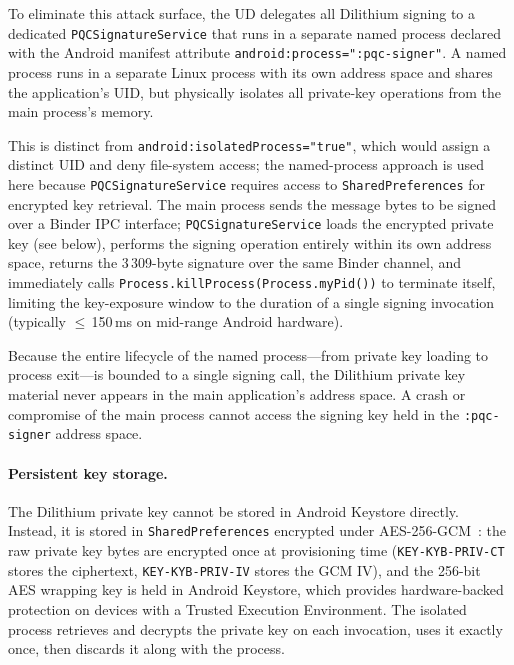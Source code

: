 \documentclass[runningheads]{llncs}
\begin{document}
To eliminate this attack surface, the UD delegates all Dilithium signing to a
dedicated \texttt{PQCSignatureService} that runs in a separate named process
declared with the Android manifest attribute \texttt{android:\allowbreak process=":\allowbreak pqc-signer"}.
A named process runs in a separate Linux process with its own address space
and shares the application's UID, but physically isolates all private-key
operations from the main process's memory.
{\sloppy
This is distinct from \texttt{android:\allowbreak isolated\allowbreak Process="true"}, which would
assign a distinct UID and deny file-system access; the named-\allowbreak process approach
is used here because \texttt{PQCSignature\allowbreak Service} requires access to
\texttt{Shared\allowbreak Preferences} for encrypted key retrieval.
The main process sends the message bytes to be signed over a Binder IPC
interface; \texttt{PQCSignature\allowbreak Service} loads the encrypted private key (see
below), performs the signing operation entirely within its own address space,
returns the 3\,309-byte signature over the same Binder channel, and
immediately calls \texttt{Process.\allowbreak kill\allowbreak Process(Process.\allowbreak my\allowbreak Pid())} to terminate
itself, limiting the key-exposure window to the duration of a single signing invocation (typically $\le$\,150\,ms on mid-range Android hardware).
\par}
Because the entire lifecycle of the named process---from private key
loading to process exit---is bounded to a single signing call, the Dilithium
private key material never appears in the main application's address space.
A crash or compromise of the main process cannot access the signing key
held in the \texttt{:pqc-signer} address space.

\paragraph{Persistent key storage.}
The Dilithium private key cannot be stored in Android Keystore directly.
Instead, it is stored in \texttt{SharedPreferences} encrypted under AES-256-GCM~\cite{NIST:SP80038D}:
the raw private key bytes are encrypted once at provisioning time
(\texttt{KEY-KYB-PRIV-CT} stores the ciphertext, \texttt{KEY-KYB-PRIV-IV}
stores the GCM IV), and the 256-bit AES wrapping key is held in Android
Keystore, which provides hardware-backed protection on devices with a Trusted
Execution Environment.
The isolated process retrieves and decrypts the private key on each invocation,
uses it exactly once, then discards it along with the process.
\end{document}
